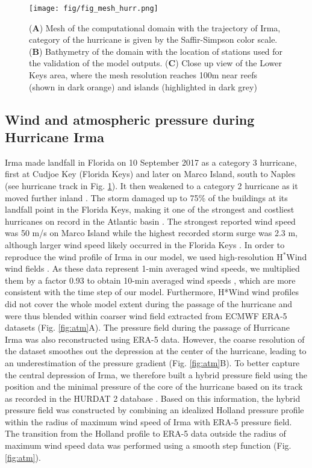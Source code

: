 \documentclass[preprint,12pt,authoryear]{elsarticle}
\begin{document}
\begin{figure}
    \centering
    \texttt{[image: fig/fig\_mesh\_hurr.png]}
    \caption{(\textbf{A}) Mesh of the computational domain with the trajectory of Irma, category of the hurricane is given by the Saffir-Simpson color scale. (\textbf{B}) Bathymetry of the domain with the location of stations used for the validation of the model outputs. (\textbf{C}) Close up view of the Lower Keys area, where the mesh resolution reaches 100m near reefs (shown in dark orange) and islands (highlighted in dark grey)}
    \label{fig:mesh}
\end{figure}

\subsection{Wind and atmospheric pressure during Hurricane Irma}

Irma made landfall in Florida on 10 September 2017 as a category 3 hurricane, first at Cudjoe Key (Florida Keys) and later on Marco Island, south to Naples (see hurricane track in Fig. \ref{fig:mesh}). It then weakened to a category 2 hurricane as it moved further inland \citep{pinelli2018overview}. The storm damaged up to 75\% of the buildings at its landfall point in the Florida Keys, making it one of the strongest and costliest hurricanes on record in the Atlantic basin \citep{xian2018brief,zhang2019modeling}. The strongest reported wind speed was 50 m/s on Marco Island while the highest recorded storm surge was 2.3 m, although larger wind speed likely occurred in the Florida Keys \citep{pinelli2018overview}. In order to reproduce the wind profile of Irma in our model, we used high-resolution H$^\ast$Wind wind fields \citep{powell1998hrd}. As these data represent 1-min averaged wind speeds, we multiplied them by a factor 0.93 to obtain 10-min averaged wind speeds \citep{harper2010guidelines}, which are more consistent with the time step of our model. Furthermore, H*Wind wind profiles did not cover the whole model extent during the passage of the hurricane and were thus blended within coarser wind field extracted from ECMWF ERA-5 datasets (Fig. \ref{fig:atm}A). The pressure field during the passage of Hurricane Irma was also reconstructed using ERA-5 data. However, the coarse resolution of the dataset smoothes out the depression at the center of the hurricane, leading to an underestimation of the pressure gradient (Fig. \ref{fig:atm}B). To better capture the central depression of Irma, we therefore built a hybrid pressure field using the position and the minimal pressure of the core of the hurricane based on its track as recorded in the HURDAT 2 database \citep{landsea2013atlantic}. Based on this information, the hybrid pressure field was constructed by combining an idealized Holland pressure profile \citep{lin2012hurricane} within the radius of maximum wind speed of Irma \citep{knaff2018statistical} with ERA-5 pressure field. The transition from the Holland profile to ERA-5 data outside the radius of maximum wind speed data was performed using a smooth step function (Fig. \ref{fig:atm}).
\end{document}
